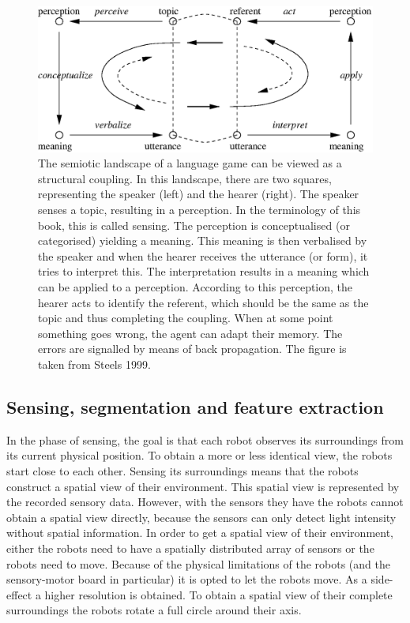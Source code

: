 
\begin{figure}[t]
\centerline{\includegraphics[width=12cm]{discr_games/semiotic1.eps}}
\caption{The semiotic landscape of a language game can be viewed as a structural coupling. In this landscape, there are two squares, representing the speaker (left) and the hearer (right). The speaker senses a topic, resulting in a perception. In the terminology of this book, this is called sensing. The perception is conceptualised (or categorised) yielding a meaning. This meaning is then verbalised by the speaker and when the hearer receives the utterance (or form), it tries to interpret this. The interpretation results in a meaning which can be applied to a perception. According to this perception, the hearer acts to identify the referent, which should be the same as the topic and thus completing the coupling. When at some point something goes wrong, the agent can adapt their memory. The errors are signalled by means of back propagation. The figure is taken from Steels 1999.}
\label{f:cm:semiotic}
\end{figure}

\subsection{Sensing, segmentation and feature extraction}\label{s:lg:perception}


In the phase of sensing, the goal is that each robot observes its surroundings from its current physical position. To obtain a more or less identical view, the robots start close to each other. Sensing its surroundings means that the robots construct a spatial view of their environment. This spatial view is represented by the recorded sensory data. However, with the sensors they have the robots cannot obtain a spatial view directly, because the sensors can only detect light intensity without spatial information. In order to get a spatial view of their environment, either the robots need to have a spatially distributed array of sensors or the robots need to move. Because of the physical limitations of the robots (and the sensory-motor board in particular) it is opted to let the robots move. As a side-effect a higher resolution is obtained. To obtain a spatial view of their complete surroundings the robots rotate a full circle around their axis.

